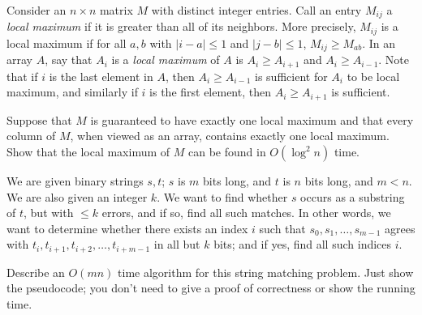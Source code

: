 \begin{qunlist}
\pagebreak
{}

Consider an $n\times n$ matrix $M$ with distinct integer entries. Call an entry $M_{ij}$ a \emph{local maximum} if it is greater than all of its neighbors. More precisely, $M_{ij}$ is a local maximum if for all $a,b$ with $|i-a|\le 1$ and $|j-b|\le 1$, $M_{ij} \ge M_{ab}$. In an array $A$, say that $A_i$ is a \emph{local maximum} of $A$ is $A_i \ge A_{i+1}$ and $A_i \ge A_{i-1}$. Note that if $i$ is the last element in $A$, then $A_i \geq A_{i-1}$ is sufficient for $A_i$ to be local maximum, and similarly if $i$ is the first element, then $A_i \geq A_{i+1}$ is sufficient.

Suppose that $M$ is guaranteed to have exactly one local maximum and that every column of $M$, when viewed as an array, contains exactly one local maximum. Show that the local maximum of $M$ can be found in $O(\log^2 n)$ time. 




\pagebreak
{}

We are given binary strings $s,t$; $s$ is $m$ bits long, and $t$ is $n$ bits long,
and $m<n$.
We are also given an integer $k$.
We want to find whether $s$ occurs as a substring of $t$,
but with $\le k$ errors, and if so, find all such matches.
In other words, we want to determine whether there exists an index $i$
such that $s_0,s_1,\dots,s_{m-1}$ agrees with
$t_i,t_{i+1},t_{i+2},\dots,t_{i+m-1}$ in all but $k$ bits; and if yes,
find all such indices $i$.
\begin{qparts}
\item Describe an $O(mn)$ time algorithm for this string matching problem.
Just show the pseudocode; you don't need to give a proof of correctness
or show the running time.\\


\end{qparts}
\end{qunlist}
